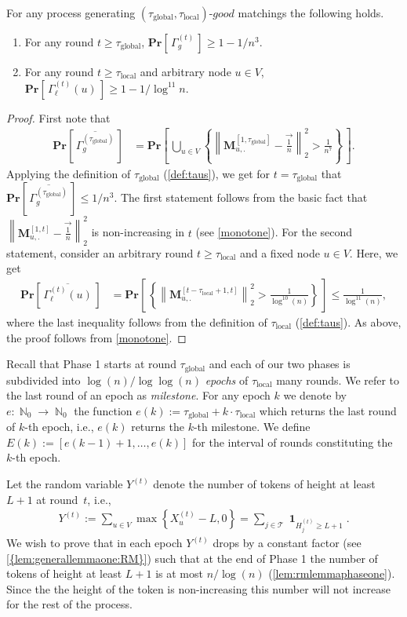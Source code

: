 \documentclass[twoside,leqno]{article}
\DeclareMathOperator{\N}{\mathbb{N}}
\newcommand{\Pro}[1]{\mathbf{Pr} \left[\,#1\,\right]}
\newcommand{\M}{\mathbf{M}}
\DeclareMathOperator{\1}{\mathbf{1}}
\newcommand{\taulocal}{\tau_{\mathrm{local}}}
\newcommand{\tauglobal}{\tau_{\mathrm{global}}}
\numberwithin{equation}{section}
\newcommand{\newL}{L}
\begin{document}
\begin{lemma}
\label{lem:Gamma:GL}
For any process generating $(\tauglobal,\taulocal)$-$good$ matchings the following holds.
\begin{enumerate}\itemsep0pt
\item For any round $t\ge \tauglobal$,
$\displaystyle
\Pro{ \Gamma_g^{(t)} } \geq 1-1/n^3.
$
\item For any round $t \geq \taulocal$ and arbitrary node $u\in V$,
$\displaystyle
\Pro{ \Gamma_{\ell}^{(t)}(u) } \geq 1 - 1/\log^{11} n.
$ 
\end{enumerate}
\end{lemma}
\begin{proof}
    First note that
\begin{align}
\Pro{\overline{\Gamma_g^{(\tauglobal)}}} &= \Pro{\bigcup_{u \in V} \left\{\left\| \M_{u,.}^{[1,\tauglobal]} - \vec{ \frac{1}{n}} \right\|_2^2 > \frac{1}{n^7}\right\}} . \label{eq:notGammaGlobal}
\end{align}
Applying the definition of $\tauglobal$ (\cref{def:taus}), we get for 
$ t=\tauglobal$ that $\Pro{\overline{\Gamma_g^{(\tauglobal)}}}\le 1/n^3$.
The first statement follows from the basic fact that $ \left\| \M_{u,.}^{[1,t]} - \vec{ \frac{1}{n}} \right\|_2^2$ is non-increasing in $t$ (see 
\cref{monotone}).
For the second statement, consider an arbitrary round $t\ge \taulocal$ and a fixed node $u\in V$. Here, we get
\begin{align*}
\Pro{\overline{\Gamma_{\ell}^{(t)}(u)}} &= \Pro{ \left\{\left\| \M_{u,.}^{[t-\taulocal+1,t]} \right\|_2^2 > \frac{1}{\log^{10}(n)}\right\}} \le \frac{1}{\log^{11}(n)},
\end{align*}
where the last inequality follows from the definition of $\taulocal$ (\cref{def:taus}). As above, the proof follows from \cref{monotone}.
\end{proof}


Recall that  Phase 1 starts at round $\tauglobal$ and each of our two phases is subdivided into $\log (n)/\log\log(n)$ \emph{epochs} of $\taulocal$ many rounds. We refer to the last round of an epoch as \emph{milestone}. For any epoch $k$ we denote by $e: \N_{0} \rightarrow \N_{0}$ the function $e(k):=\tauglobal+k \cdot \taulocal$ which returns the last round of $k$-th epoch, i.e., $e(k)$ returns the $k$-th milestone. We define $E(k):=[e(k-1)+1,\ldots,e(k)]$ for the interval of rounds constituting the $k$-th epoch.

Let the random variable $Y^{(t)}$ denote the number of tokens of height at least $\newL+1$ at round~$t$, i.e.,
\begin{align}
Y^{(t)} := \sum_{u \in V} \max\left\{ X_u^{(t)}- \newL ,0 \right\} = \sum_{j \in \mathcal{T}} \1_{H_j^{(t)} \geq \newL+1}. 
\end{align} We wish to prove that in each epoch $Y^{(t)}$ drops by a constant factor (see \cref{{lem:generallemmaone:RM}}) such that at the end of Phase 1 the number of tokens of height at least $\newL+1$ is at most $n/\log(n)$ (\cref{lem:rmlemmaphaseone}). Since the
the height of the token is non-increasing this number will not increase for the rest of the process.
\end{document}
